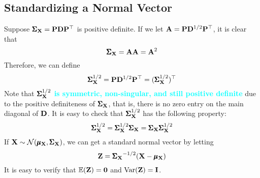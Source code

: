      \subsection{Standardizing a Normal Vector}
     Suppose $\pmb{\Sigma}_{\mathbf{X}} = \mathbf{P}\mathbf{D}\mathbf{P}^{\top}$ is positive definite. If we let $\mathbf{A} = \mathbf{P}\mathbf{D}^{1/2}\mathbf{P}^{\top}$, it is clear that
     \begin{equation}
         \pmb{\Sigma}_{\mathbf{X}} = \mathbf{A}\mathbf{A} = \mathbf{A}^2
     \end{equation}
     Therefore, we can define
     \begin{equation}
         \pmb{\Sigma}_{\mathbf{X}}^{1/2} = \mathbf{P}\mathbf{D}^{1/2}\mathbf{P}^{\top} = (\pmb{\Sigma}_{\mathbf{X}}^{1/2})^{\top}
     \end{equation} 
     Note that \textbf{\textcolor{cyan}{$\pmb{\Sigma}_{\mathbf{X}}^{1/2}$ is symmetric, non-singular, and still positive definite}} due to the positive definiteness of $\pmb{\Sigma}_{\mathbf{X}}$, that is, there is no zero entry on the main diagonal of $\mathbf{D}$.
     It is easy to check that $\pmb{\Sigma}_{\mathbf{X}}^{1/2}$ has the following property:
    \begin{equation}
        \pmb{\Sigma}_{\mathbf{X}}^{1/2} = \pmb{\Sigma}_{\mathbf{X}}^{1/2} \pmb{\Sigma}_{\mathbf{X}} = \pmb{\Sigma}_{\mathbf{X}} \pmb{\Sigma}_{\mathbf{X}}^{1/2}
    \end{equation}
    If $\mathbf{X}\sim\mathcal{N}(\pmb{\mu}_{\mathbf{X}}, \pmb{\Sigma}_{\mathbf{X}})$,
    we can get a standard normal vector by letting
    \begin{equation}
        \mathbf{Z} = \mathbf{\pmb{\Sigma}_{\mathbf{X}}}^{-1/2}(\mathbf{X} - \pmb{\mu}_{\mathbf{X}})
    \end{equation}
    It is easy to verify that $\mathbb{E}(\mathbf{Z}) = \mathbf{0}$ and $\text{Var}(\mathbf{Z}) = \mathbf{I}$.


